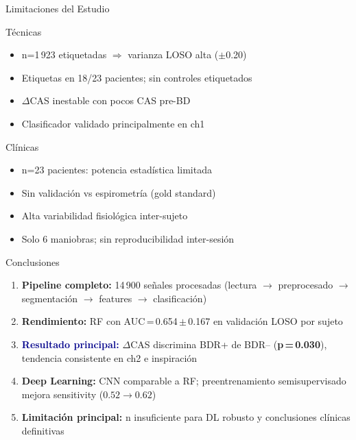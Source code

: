 ﻿\documentclass[aspectratio=169,10pt]{beamer}
\begin{document}
\begin{frame}{Limitaciones del Estudio}
  \begin{alertblock}{Técnicas}
    \begin{itemize}\small
      \item n=1\,923 etiquetadas $\Rightarrow$ varianza LOSO alta ($\pm$0.20)
      \item Etiquetas en 18/23 pacientes; sin controles etiquetados
      \item $\Delta$CAS inestable con pocos CAS pre-BD
      \item Clasificador validado principalmente en ch1
    \end{itemize}
  \end{alertblock}
  \begin{alertblock}{Clínicas}
    \begin{itemize}\small
      \item n=23 pacientes: potencia estadística limitada
      \item Sin validación vs espirometría (gold standard)
      \item Alta variabilidad fisiológica inter-sujeto
      \item Solo 6 maniobras; sin reproducibilidad inter-sesión
    \end{itemize}
  \end{alertblock}
\end{frame}

\begin{frame}{Conclusiones}
  \begin{enumerate}\setlength{\itemsep}{9pt}
    \item \textbf{Pipeline completo:} 14\,900 señales procesadas (lectura $\to$ preprocesado $\to$ segmentación $\to$ features $\to$ clasificación)
    \item \textbf{Rendimiento:} RF con AUC\,=\,0.654\,$\pm$\,0.167 en validación LOSO por sujeto
    \item \textcolor{darkblue}{\textbf{Resultado principal:}} $\Delta$CAS discrimina BDR+ de BDR-- (\textbf{p\,=\,0.030}), tendencia consistente en ch2 e inspiración
    \item \textbf{Deep Learning:} CNN comparable a RF; preentrenamiento semisupervisado mejora sensitivity ($0.52 \to 0.62$)
    \item \textbf{Limitación principal:} n insuficiente para DL robusto y conclusiones clínicas definitivas
  \end{enumerate}
\end{frame}
\end{document}
